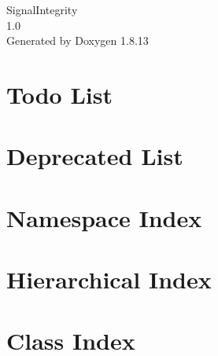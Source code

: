 \documentclass[twoside]{book}
\newcommand{\+}{\discretionary{\mbox{\scriptsize$\hookleftarrow$}}{}{}}
\newcommand{\clearemptydoublepage}{%
  \newpage{\pagestyle{empty}\cleardoublepage}%
}
\begin{document}
\hypersetup{pageanchor=false,
             bookmarksnumbered=true,
             pdfencoding=unicode
            }
\begin{titlepage}
\vspace*{7cm}
\begin{center}%
{\Large Signal\+Integrity \\[1ex]\large 1.\+0 }\\
\vspace*{1cm}
{\large Generated by Doxygen 1.8.13}\\
\end{center}
\end{titlepage}
\clearemptydoublepage
{}
\tableofcontents
\clearemptydoublepage
{}
\hypersetup{pageanchor=true}

\chapter{Todo List}
\label{todo}

\chapter{Deprecated List}
\label{deprecated}

\chapter{Namespace Index}

\chapter{Hierarchical Index}

\chapter{Class Index}

\end{document}
